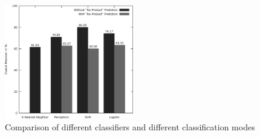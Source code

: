 \begin{figure}
	\begin{center}
		\includegraphics[width=0.5\textwidth]{figures/product_eval.eps}
	\end{center}
	\caption{Comparison of different classifiers and different classification modes}
	\label{fig:product_eval}
\end{figure}

